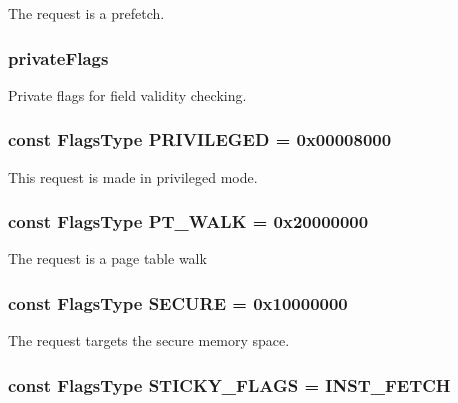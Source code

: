 The request is a prefetch. \hypertarget{classRequest_ac782f50d7181bf00501f6aeffe814aae}{
\subsubsection[{privateFlags}]{ {\bf privateFlags}}}
\label{classRequest_ac782f50d7181bf00501f6aeffe814aae}
Private flags for field validity checking. \hypertarget{classRequest_aac83867bccac8d23030781df154dc69e}{
\subsubsection[{PRIVILEGED}]{\setlength{\rightskip}{0pt plus 5cm}const {\bf FlagsType} {\bf PRIVILEGED} = 0x00008000}}
\label{classRequest_aac83867bccac8d23030781df154dc69e}
This request is made in privileged mode. \hypertarget{classRequest_a55ac67fac829c3904728e74d5acf33af}{
\subsubsection[{PT\_\-WALK}]{\setlength{\rightskip}{0pt plus 5cm}const {\bf FlagsType} {\bf PT\_\-WALK} = 0x20000000}}
\label{classRequest_a55ac67fac829c3904728e74d5acf33af}
The request is a page table walk \hypertarget{classRequest_a096bc7521755b6680d9a1988a6c9b109}{
\subsubsection[{SECURE}]{\setlength{\rightskip}{0pt plus 5cm}const {\bf FlagsType} {\bf SECURE} = 0x10000000}}
\label{classRequest_a096bc7521755b6680d9a1988a6c9b109}
The request targets the secure memory space. \hypertarget{classRequest_ad6eb90201da8e09a9d6b9029d8a8485c}{
\subsubsection[{STICKY\_\-FLAGS}]{\setlength{\rightskip}{0pt plus 5cm}const {\bf FlagsType} {\bf STICKY\_\-FLAGS} = {\bf INST\_\-FETCH}}}

